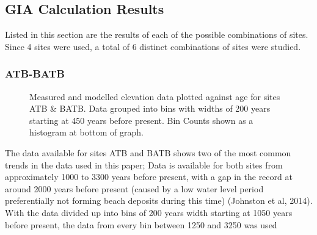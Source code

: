 

\subsection{GIA Calculation Results}



Listed in this section are the results of each of the possible combinations of sites.
Since 4 sites were used, a total of 6 distinct combinations of sites were studied.


\subsubsection{ATB-BATB}

\begin{figure}[H]
	\caption{Measured and modelled elevation data plotted against age for sites ATB \& BATB. Data grouped into bins with widths of 200 years starting at 450 years before present. Bin Counts shown as a histogram at bottom of graph.}
	\label{fig:data_ATBxBATB}
\end{figure}
The data available for sites ATB and BATB shows two of the most common trends in
 the data used in this paper; Data is available for both sites from
 approximately 1000 to 3300 years before present,
 with a gap in the record at around 2000 years before present (caused by a low
 water level period preferentially not forming beach deposits during this time)
 (Johnston et al, 2014). With the data divided up into bins of 200 years width
 starting at 1050 years before present, the data from every bin between 1250 and 3250 was used
